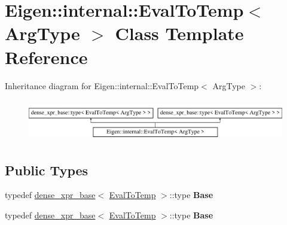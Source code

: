 \hypertarget{class_eigen_1_1internal_1_1_eval_to_temp}{}\section{Eigen\+:\+:internal\+:\+:Eval\+To\+Temp$<$ Arg\+Type $>$ Class Template Reference}
\label{class_eigen_1_1internal_1_1_eval_to_temp}
Inheritance diagram for Eigen\+:\+:internal\+:\+:Eval\+To\+Temp$<$ Arg\+Type $>$\+:\begin{figure}[H]
\begin{center}
\leavevmode
\includegraphics[height=1.812298cm]{class_eigen_1_1internal_1_1_eval_to_temp}
\end{center}
\end{figure}
\subsection*{Public Types}
\begin{DoxyCompactItemize}
\item 
\mbox{\label{class_eigen_1_1internal_1_1_eval_to_temp_a087cbd9b48266c6ce096ae8c38b39458}} 
typedef \hyperlink{struct_eigen_1_1internal_1_1dense__xpr__base}{dense\+\_\+xpr\+\_\+base}$<$ \hyperlink{class_eigen_1_1internal_1_1_eval_to_temp}{Eval\+To\+Temp} $>$\+::type {\bfseries Base}
\item 
\mbox{\label{class_eigen_1_1internal_1_1_eval_to_temp_a087cbd9b48266c6ce096ae8c38b39458}} 
typedef \hyperlink{struct_eigen_1_1internal_1_1dense__xpr__base}{dense\+\_\+xpr\+\_\+base}$<$ \hyperlink{class_eigen_1_1internal_1_1_eval_to_temp}{Eval\+To\+Temp} $>$\+::type {\bfseries Base}
\end{DoxyCompactItemize}
